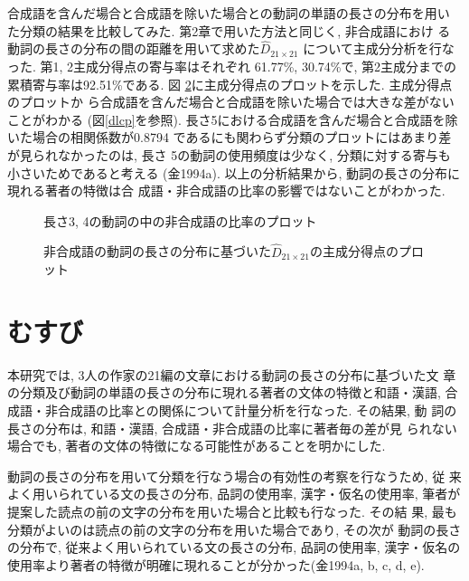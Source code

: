 合成語を含んだ場合と合成語を除いた場合との動詞の単語の長さの分布を用い
た分類の結果を比較してみた. 第2章で用いた方法と同じく, 非合成語におけ
る動詞の長さの分布の間の距離を用いて求めた$\widehat{D}_{21 \times 21}$
について主成分分析を行なった. 第1, 2主成分得点の寄与率はそれぞれ
61.77\%, 30.74\%で, 第2主成分までの累積寄与率は92.51\%である. 図
\ref{goseigopf2}に主成分得点のプロットを示した. 主成分得点のプロットか
ら合成語を含んだ場合と合成語を除いた場合では大きな差がないことがわかる
(図{\ref{dlcp}}を参照).  
長さ5における合成語を含んだ場合と合成語を除いた場合の相関係数が0.8794
であるにも関わらず分類のプロットにはあまり差が見られなかったのは, 長さ
5の動詞の使用頻度は少なく, 分類に対する寄与も小さいためであると考える
(金1994a). 以上の分析結果から, 動詞の長さの分布に現れる著者の特徴は合
成語・非合成語の比率の影響ではないことがわかった.  

{\unitlength=1mm
\begin{figure}
\begin{center}
    
    
    
\end{center}
\caption{長さ3, 4の動詞の中の非合成語の比率のプロット}\label{goseigopf}
\end{figure}

\begin{figure}
\begin{center}
    
    
    
\end{center}
\caption{非合成語の動詞の長さの分布に基づいた$\widehat{D}_{21 \times 21}$の主成分得点のプロット}\label{goseigopf2}
\end{figure}
}

\section{むすび}
本研究では, 3人の作家の21編の文章における動詞の長さの分布に基づいた文
章の分類及び動詞の単語の長さの分布に現れる著者の文体の特徴と和語・漢語, 
合成語・非合成語の比率との関係について計量分析を行なった. その結果, 動
詞の長さの分布は,  和語・漢語, 合成語・非合成語の比率に著者毎の差が見
られない場合でも, 著者の文体の特徴になる可能性があることを明かにした.


動詞の長さの分布を用いて分類を行なう場合の有効性の考察を行なうため, 従
来よく用いられている文の長さの分布, 品詞の使用率, 漢字・仮名の使用率, 
筆者が提案した読点の前の文字の分布を用いた場合と比較も行なった. その結
果, 最も分類がよいのは読点の前の文字の分布を用いた場合であり, その次が
動詞の長さの分布で, 従来よく用いられている文の長さの分布, 品詞の使用率, 
漢字・仮名の使用率より著者の特徴が明確に現れることが分かった(金1994a,
b, c, d, e).  

